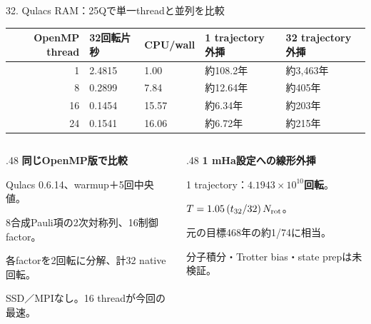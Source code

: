 \begin{frame}{32. Qulacs RAM：25Qで単一threadと並列を比較}
  \small
  \begin{tabularx}{\textwidth}{@{}rXXXX@{}}
    \toprule OpenMP thread & 32回転片 秒 & CPU/wall & 1 trajectory 外挿 & 32 trajectory 外挿 \\
    \midrule
    1 & 2.4815 & 1.00 & 約108.2年 & 約3,463年 \\
    8 & 0.2899 & 7.84 & 約12.64年 & 約405年 \\
    16 & 0.1454 & 15.57 & 約6.34年 & 約203年 \\
    24 & 0.1541 & 16.06 & 約6.72年 & 約215年 \\
    \bottomrule
  \end{tabularx}
  \medskip
  \begin{columns}[T,onlytextwidth]
    \begin{column}{.48\textwidth}
      \textbf{同じOpenMP版で比較}\par
      \small Qulacs 0.6.14、warmup＋5回中央値。\par
      8合成Pauli項の2次対称列、16制御factor。\par
      各factorを2回転に分解、計32 native回転。\par
      SSD／MPIなし。16 threadが今回の最速。
    \end{column}
    \begin{column}{.48\textwidth}
      \textbf{1 mHa設定への線形外挿}\par
      \small 1 trajectory：\textbf{$4.1943\times10^{10}$回転}。\par
      $T=1.05\,(t_{32}/32)\,N_{\rm rot}$。\par
      元の目標468年の約1/74に相当。\par
      分子積分・Trotter bias・state prepは未検証。
    \end{column}
  \end{columns}
\end{frame}


